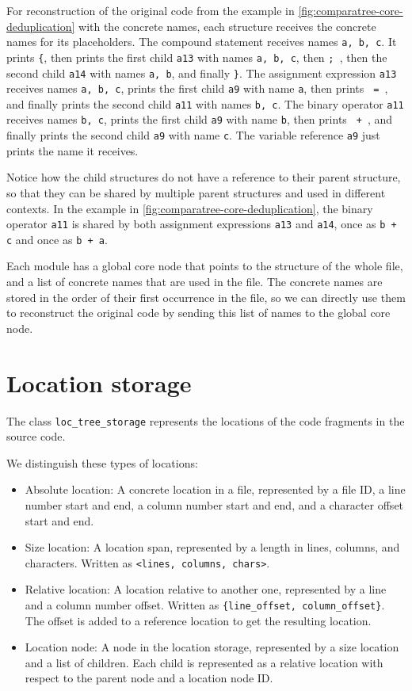 For reconstruction of the original code from the example in \autoref{fig:comparatree-core-deduplication} with the concrete names, each structure receives the concrete names for its placeholders.
The compound statement receives names \verb|a, b, c|.
It prints \verb|{|, then prints the first child \verb|a13| with names \verb|a, b, c|, then \verb|; |, then the second child \verb|a14| with names \verb|a, b|, and finally \verb|}|.
The assignment expression \verb|a13| receives names \verb|a, b, c|, prints the first child \verb|a9| with name \verb|a|, then prints \verb| = |, and finally prints the second child \verb|a11| with names \verb|b, c|.
The binary operator \verb|a11| receives names \verb|b, c|, prints the first child \verb|a9| with name \verb|b|, then prints \verb| + |, and finally prints the second child \verb|a9| with name \verb|c|.
The variable reference \verb|a9| just prints the name it receives.

Notice how the child structures do not have a reference to their parent structure, so that they can be shared by multiple parent structures and used in different contexts.
In the example in \autoref{fig:comparatree-core-deduplication}, the binary operator \verb|a11| is shared by both assignment expressions \verb|a13| and \verb|a14|, once as \verb|b + c| and once as \verb|b + a|.

Each module has a global core node that points to the structure of the whole file, and a list of concrete names that are used in the file.
The concrete names are stored in the order of their first occurrence in the file, so we can directly use them to reconstruct the original code by sending this list of names to the global core node.

\section{Location storage}

The class \verb|loc_tree_storage| represents the locations of the code fragments in the source code.

We distinguish these types of locations:
\begin{itemize}
\item Absolute location: A concrete location in a file, represented by a file ID, a line number start and end, a column number start and end, and a character offset start and end.
\item Size location: A location span, represented by a length in lines, columns, and characters. Written as \verb|<lines, columns, chars>|.
\item Relative location: A location relative to another one, represented by a line and a column number offset. Written as \verb|{line_offset, column_offset}|. The offset is added to a reference location to get the resulting location.
\item Location node: A node in the location storage, represented by a size location and a list of children. Each child is represented as a relative location with respect to the parent node and a location node ID.
\end{itemize}

